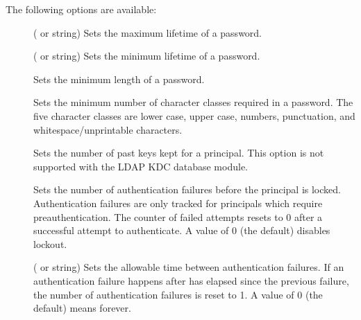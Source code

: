 \documentclass[letterpaper,10pt,english]{sphinxmanual}
\begin{document}
The following options are available:
\begin{description}
\item[{ }] \leavevmode
( or  string) Sets the maximum
lifetime of a password.

\item[{ }] \leavevmode
( or  string) Sets the minimum
lifetime of a password.

\item[{ }] \leavevmode
Sets the minimum length of a password.

\item[{ }] \leavevmode
Sets the minimum number of character classes required in a
password.  The five character classes are lower case, upper case,
numbers, punctuation, and whitespace/unprintable characters.

\item[{ }] \leavevmode
Sets the number of past keys kept for a principal.  This option is
not supported with the LDAP KDC database module.

\end{description}
\label{\detokenize{admin/database:policy-maxfailure}}\begin{description}
\item[{ }] \leavevmode
Sets the number of authentication failures before the principal is
locked.  Authentication failures are only tracked for principals
which require preauthentication.  The counter of failed attempts
resets to 0 after a successful attempt to authenticate.  A
 value of 0 (the default) disables lockout.

\end{description}
\label{\detokenize{admin/database:policy-failurecountinterval}}\begin{description}
\item[{ }] \leavevmode
( or  string) Sets the allowable time
between authentication failures.  If an authentication failure
happens after  has elapsed since the previous
failure, the number of authentication failures is reset to 1.  A
 value of 0 (the default) means forever.

\end{description}
\end{document}
